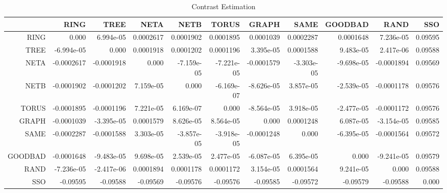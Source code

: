 \documentclass[a4paper,10pt]{article}
\begin{document}
\begin{landscape}
\begin{table}[!htp]
\centering\tiny
\caption{Contrast Estimation}
\begin{tabular}{
|r|r|r|r|r|r|r|r|r|r|r|}
\hline
 & RING& TREE& NETA& NETB& TORUS& GRAPH& SAME& GOODBAD& RAND& SSO\\
\hline
 RING&0.000&6.994e-05&0.0002617&0.0001902&0.0001895&0.0001039&0.0002287&0.0001648&7.236e-05&0.09595\\
\hline
 TREE&-6.994e-05&0.000&0.0001918&0.0001202&0.0001196&3.395e-05&0.0001588&9.483e-05&2.417e-06&0.09588\\
\hline
 NETA&-0.0002617&-0.0001918&0.000&-7.159e-05&-7.221e-05&-0.0001579&-3.303e-05&-9.698e-05&-0.0001894&0.09569\\
\hline
 NETB&-0.0001902&-0.0001202&7.159e-05&0.000&-6.169e-07&-8.626e-05&3.857e-05&-2.539e-05&-0.0001178&0.09576\\
\hline
 TORUS&-0.0001895&-0.0001196&7.221e-05&6.169e-07&0.000&-8.564e-05&3.918e-05&-2.477e-05&-0.0001172&0.09576\\
\hline
 GRAPH&-0.0001039&-3.395e-05&0.0001579&8.626e-05&8.564e-05&0.000&0.0001248&6.087e-05&-3.154e-05&0.09585\\
\hline
 SAME&-0.0002287&-0.0001588&3.303e-05&-3.857e-05&-3.918e-05&-0.0001248&0.000&-6.395e-05&-0.0001564&0.09572\\
\hline
 GOODBAD&-0.0001648&-9.483e-05&9.698e-05&2.539e-05&2.477e-05&-6.087e-05&6.395e-05&0.000&-9.241e-05&0.09579\\
\hline
 RAND&-7.236e-05&-2.417e-06&0.0001894&0.0001178&0.0001172&3.154e-05&0.0001564&9.241e-05&0.000&0.09588\\
\hline
 SSO&-0.09595&-0.09588&-0.09569&-0.09576&-0.09576&-0.09585&-0.09572&-0.09579&-0.09588&0.000\\
\hline

\end{tabular}
\end{table}

\newpage


\end{landscape}
\end{document}
